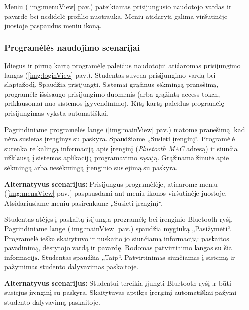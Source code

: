 \documentclass{VUMIFPSkursinis}
\begin{document}
Meniu (\ref{img:menuView} pav.) pateikiamas prisijungusio naudotojo vardas ir pavardė bei nedidelė profilio nuotrauka. Meniu atidaryti galima viršutinėje juostoje paspaudus meniu ikoną.

\subsubsection{Programėlės naudojimo scenarijai}


Įdiegus ir pirmą kartą programėlę paleidus naudotojui atidaromas prisijungimo langas (\ref{img:loginView} pav.). Studentas suveda prisijungimo vardą bei slaptažodį. Spaudžia prisijungti. Sistemai grąžinus sėkmingą pranešimą, programėlė išsisaugo prisijungimo duomenis (arba grąžintą access token, priklausomai nuo sistemos įgyvendinimo). Kitą kartą paleidus programėlę prisijungimas vyksta automatiškai.


Pagrindiniame programėlės lange (\ref{img:mainView} pav.) matome pranešimą, kad nėra susietas įrenginys su paskyra. Spaudžiame „Susieti įrenginį“. Programėlė surenka reikalingą informaciją apie įrenginį (\textit{Bluetooth MAC} adresą) ir siunčia užklausą į sistemos aplikacijų programavimo sąsają. Grąžinama žinutė apie sėkmingą arba nesėkmingą įrenginio susiejimą su paskyra.

\textbf{Alternatyvus scenarijus:} Prisijungus programėlėje, atidarome meniu (\ref{img:menuView} pav.) paspausdami ant meniu ikonos viršutinėje juostoje. Atsidariusiame meniu pasirenkame „Susieti įrenginį“.


Studentas atėjęs į paskaitą įsijungia programėlę bei įrenginio Bluetooth ryšį. Pagrindiniame lange (\ref{img:mainView} pav.) spaudžia mygtuką „Pasižymėti“. Programėlė ieško skaitytuvo ir nuskaito jo siunčiamą informaciją: paskaitos pavadinimą, dėstytojo vardą ir pavardę. Rodomas patvirtinimo langas su šia informacija. Studentas spaudžia „Taip“. Patvirtinimas siunčiamas į sistemą ir pažymimas studento dalyvavimas paskaitoje.

\textbf{Alternatyvus scenarijus:} Studentui tereikia įjungti Bluetooth ryšį ir būti susiejus įrenginį su paskyra. Skaitytuvas aptikęs įrenginį automatiškai pažymi studento dalyvavimą paskaitoje.

\end{document}
